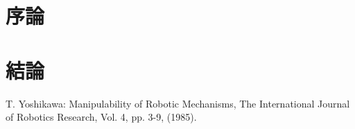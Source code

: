 \documentclass[9pt,a4paper,twocolumn]{jsarticle}
\begin{document}

\section{序論}

\section{結論}


\begin{thebibliography}{9}
T. Yoshikawa: Manipulability of Robotic Mechanisms, The International Journal of Robotics Research, Vol. 4, pp. 3-9,
(1985).
\end{thebibliography}
\end{document}
